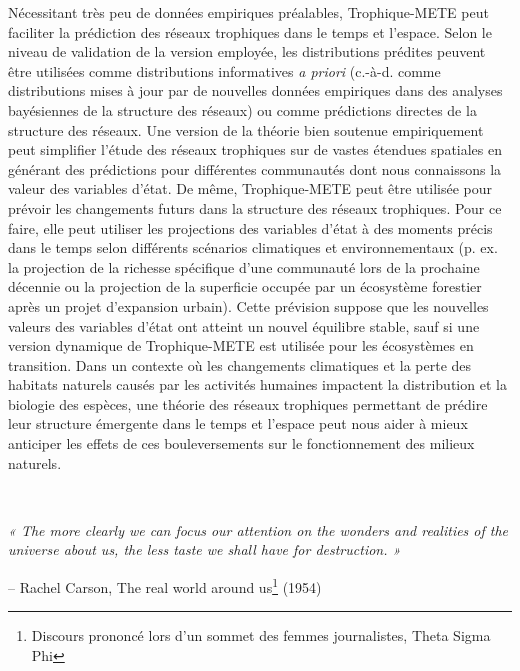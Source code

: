 Nécessitant très peu de données empiriques préalables, Trophique-METE peut
faciliter la prédiction des réseaux trophiques dans le temps et l'espace. Selon
le niveau de validation de la version employée, les distributions prédites
peuvent être utilisées comme distributions informatives \textit{a priori}
(c.-à-d. comme distributions mises à jour par de nouvelles données empiriques
dans des analyses bayésiennes de la structure des réseaux) ou comme prédictions
directes de la structure des réseaux. Une version de la théorie bien soutenue
empiriquement peut simplifier l'étude des réseaux trophiques sur de vastes
étendues spatiales en générant des prédictions pour différentes communautés dont
nous connaissons la valeur des variables d'état. De même, Trophique-METE peut
être utilisée pour prévoir les changements futurs dans la structure des réseaux
trophiques. Pour ce faire, elle peut utiliser les projections des variables
d'état à des moments précis dans le temps selon différents scénarios climatiques
et environnementaux (p. ex. la projection de la richesse spécifique d'une
communauté lors de la prochaine décennie ou la projection de la superficie
occupée par un écosystème forestier après un projet d'expansion urbain). Cette
prévision suppose que les nouvelles valeurs des variables d'état ont atteint un
nouvel équilibre stable, sauf si une version dynamique de Trophique-METE est
utilisée pour les écosystèmes en transition. Dans un contexte où les changements
climatiques et la perte des habitats naturels causés par les activités humaines
impactent la distribution et la biologie des espèces, une théorie des réseaux
trophiques permettant de prédire leur structure émergente dans le temps et
l'espace peut nous aider à mieux anticiper les effets de ces bouleversements sur
le fonctionnement des milieux naturels.

\raggedleft

\
\

\textit{« The more clearly we can focus our attention on the wonders and
realities of the universe about us, the less taste we shall have for
destruction. »} 
  

– Rachel Carson, The real world around us\footnote{Discours prononcé lors d'un sommet des femmes journalistes, Theta Sigma Phi} (1954)

\endinput


